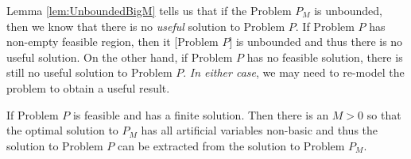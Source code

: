 \begin{remark} Lemma \ref{lem:UnboundedBigM} tells us that if the Problem $P_M$ is unbounded, then we know that there is no \textit{useful} solution to Problem $P$. If Problem $P$ has non-empty feasible region, then it [Problem $P$] is unbounded and thus there is no useful solution. On the other hand, if Problem $P$ has no feasible solution, there is still no useful solution to Problem $P$. \textit{In either case}, we may need to re-model the problem to obtain a useful result.
\end{remark}

\begin{theorem} If Problem $P$ is feasible and has a finite solution. Then there is an $M > 0$ so that the optimal solution to $P_M$ has all artificial variables non-basic and thus the solution to Problem $P$ can be extracted from the solution to Problem $P_M$.
\end{theorem}
